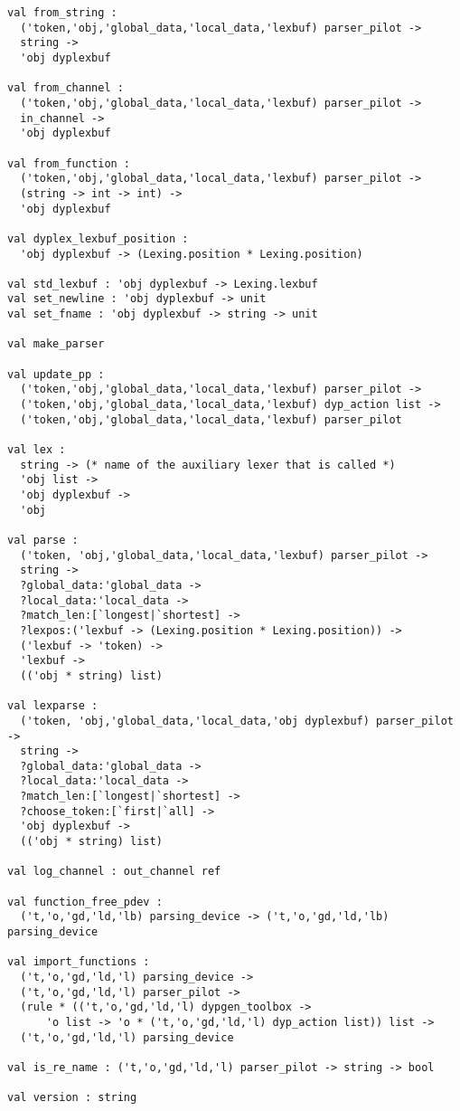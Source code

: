 \documentclass[12pt]{article}
\begin{document}
{\begin{verbatim}
val from_string :
  ('token,'obj,'global_data,'local_data,'lexbuf) parser_pilot ->
  string ->
  'obj dyplexbuf

val from_channel :
  ('token,'obj,'global_data,'local_data,'lexbuf) parser_pilot ->
  in_channel ->
  'obj dyplexbuf

val from_function :
  ('token,'obj,'global_data,'local_data,'lexbuf) parser_pilot ->
  (string -> int -> int) ->
  'obj dyplexbuf

val dyplex_lexbuf_position :
  'obj dyplexbuf -> (Lexing.position * Lexing.position)

val std_lexbuf : 'obj dyplexbuf -> Lexing.lexbuf
val set_newline : 'obj dyplexbuf -> unit
val set_fname : 'obj dyplexbuf -> string -> unit

val make_parser

val update_pp :
  ('token,'obj,'global_data,'local_data,'lexbuf) parser_pilot ->
  ('token,'obj,'global_data,'local_data,'lexbuf) dyp_action list ->
  ('token,'obj,'global_data,'local_data,'lexbuf) parser_pilot

val lex :
  string -> (* name of the auxiliary lexer that is called *)
  'obj list ->
  'obj dyplexbuf ->
  'obj

val parse :
  ('token, 'obj,'global_data,'local_data,'lexbuf) parser_pilot ->
  string ->
  ?global_data:'global_data ->
  ?local_data:'local_data ->
  ?match_len:[`longest|`shortest] ->
  ?lexpos:('lexbuf -> (Lexing.position * Lexing.position)) ->
  ('lexbuf -> 'token) ->
  'lexbuf ->
  (('obj * string) list)

val lexparse :
  ('token, 'obj,'global_data,'local_data,'obj dyplexbuf) parser_pilot ->
  string ->
  ?global_data:'global_data ->
  ?local_data:'local_data ->
  ?match_len:[`longest|`shortest] ->
  ?choose_token:[`first|`all] ->
  'obj dyplexbuf ->
  (('obj * string) list)

val log_channel : out_channel ref

val function_free_pdev :
  ('t,'o,'gd,'ld,'lb) parsing_device -> ('t,'o,'gd,'ld,'lb) parsing_device

val import_functions :
  ('t,'o,'gd,'ld,'l) parsing_device ->
  ('t,'o,'gd,'ld,'l) parser_pilot ->
  (rule * (('t,'o,'gd,'ld,'l) dypgen_toolbox ->
      'o list -> 'o * ('t,'o,'gd,'ld,'l) dyp_action list)) list ->
  ('t,'o,'gd,'ld,'l) parsing_device

val is_re_name : ('t,'o,'gd,'ld,'l) parser_pilot -> string -> bool

val version : string
\end{verbatim}

}
\end{document}
